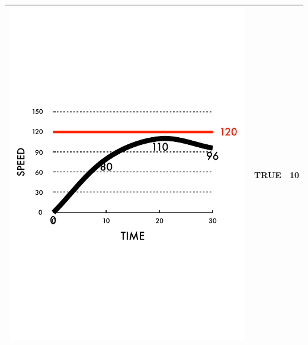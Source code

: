 \documentclass[a0paper,portrait]{baposter}
\begin{document}
\begin{poster}
{\begin{tabular}{c|c|c}
 \begin{minipage}{0.4\textwidth}\vspace{+0.2em}\includegraphics[width=0.99\textwidth]{figures/stleg2.pdf} \end{minipage}  \vspace{+0.2em}
& TRUE & 10 \\ \hline

\end{tabular}}
\end{poster}
\end{document}
